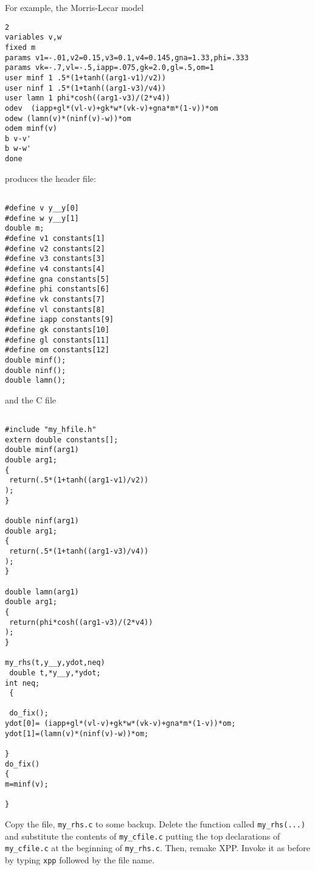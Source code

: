 For example,
the Morris-Lecar model
\begin{verbatim}
2
variables v,w
fixed m
params v1=-.01,v2=0.15,v3=0.1,v4=0.145,gna=1.33,phi=.333
params vk=-.7,vl=-.5,iapp=.075,gk=2.0,gl=.5,om=1
user minf 1 .5*(1+tanh((arg1-v1)/v2))
user ninf 1 .5*(1+tanh((arg1-v3)/v4))
user lamn 1 phi*cosh((arg1-v3)/(2*v4))
odev  (iapp+gl*(vl-v)+gk*w*(vk-v)+gna*m*(1-v))*om
odew (lamn(v)*(ninf(v)-w))*om
odem minf(v)
b v-v'
b w-w'
done
\end{verbatim}
produces the header file:
\begin{verbatim}

#define v y__y[0]
#define w y__y[1]
double m;
#define v1 constants[1]
#define v2 constants[2]
#define v3 constants[3]
#define v4 constants[4]
#define gna constants[5]
#define phi constants[6]
#define vk constants[7]
#define vl constants[8]
#define iapp constants[9]
#define gk constants[10]
#define gl constants[11]
#define om constants[12]
double minf();
double ninf();
double lamn();

\end{verbatim}
and the C file
\begin{verbatim}

#include "my_hfile.h"
extern double constants[];
double minf(arg1)
double arg1;
{ 
 return(.5*(1+tanh((arg1-v1)/v2))
);
}

double ninf(arg1)
double arg1;
{ 
 return(.5*(1+tanh((arg1-v3)/v4))
);
}

double lamn(arg1)
double arg1;
{ 
 return(phi*cosh((arg1-v3)/(2*v4))
);
}

my_rhs(t,y__y,ydot,neq)
 double t,*y__y,*ydot;
int neq;
 { 

 do_fix();
ydot[0]= (iapp+gl*(vl-v)+gk*w*(vk-v)+gna*m*(1-v))*om;
ydot[1]=(lamn(v)*(ninf(v)-w))*om;

}
do_fix()
{
m=minf(v);

}

\end{verbatim}
Copy the file, {\tt my\_rhs.c} to some backup.
 Delete the function called {\tt my\_rhs(...)} and substitute
the contents of {\tt my\_cfile.c} putting the top declarations of {\tt
my\_cfile.c} at the beginning of {\tt my\_rhs.c}.  Then, remake XPP.
Invoke it as before by typing {\tt xpp} followed by the file name. 

